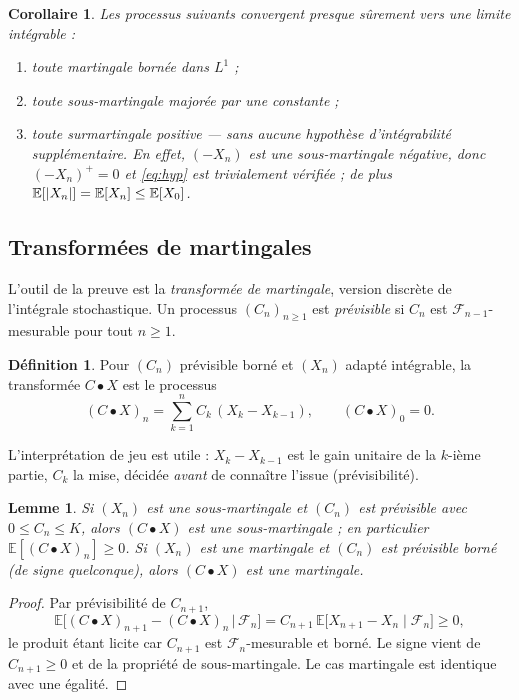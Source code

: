 \documentclass[11pt,a4paper]{article}
\theoremstyle{plain}
\newtheorem{lemma}[theorem]{Lemme}
\newtheorem{corollary}[theorem]{Corollaire}
\theoremstyle{definition}
\newtheorem{definition}[theorem]{Définition}
\theoremstyle{remark}
\newcommand{\E}{\mathbb{E}}
\newcommand{\F}{\mathcal{F}}
\DeclarePairedDelimiter{\abs}{\lvert}{\rvert}
\begin{document}
\begin{corollary}\label{cor:cas-part}
Les processus suivants convergent presque sûrement vers une limite intégrable :
\begin{enumerate}[label=(\roman*)]
\item toute martingale bornée dans $L^1$ ;
\item toute sous-martingale majorée par une constante ;
\item toute surmartingale positive --- sans aucune hypothèse d'intégrabilité
      supplémentaire. En effet, $(-X_n)$ est une sous-martingale négative, donc
      $(-X_n)^+ = 0$ et \eqref{eq:hyp} est trivialement vérifiée ; de plus
      $\E[\abs{X_n}] = \E[X_n] \le \E[X_0]$.
\end{enumerate}
\end{corollary}

\subsection{Transformées de martingales}

L'outil de la preuve est la \emph{transformée de martingale}, version discrète de
l'intégrale stochastique. Un processus $(C_n)_{n\ge1}$ est \emph{prévisible} si
$C_n$ est $\F_{n-1}$-mesurable pour tout $n \ge 1$.

\begin{definition}
Pour $(C_n)$ prévisible borné et $(X_n)$ adapté intégrable, la transformée
$C \bullet X$ est le processus
\[
(C \bullet X)_n = \sum_{k=1}^{n} C_k\,(X_k - X_{k-1}),
\qquad (C \bullet X)_0 = 0.
\]
\end{definition}

L'interprétation de jeu est utile : $X_k - X_{k-1}$ est le gain unitaire de la
$k$-ième partie, $C_k$ la mise, décidée \emph{avant} de connaître l'issue
(prévisibilité).

\begin{lemma}\label{lem:transform}
Si $(X_n)$ est une sous-martingale et $(C_n)$ est prévisible avec
$0 \le C_n \le K$, alors $(C \bullet X)$ est une sous-martingale ; en
particulier $\E[(C\bullet X)_n] \ge 0$. Si $(X_n)$ est une martingale et
$(C_n)$ est prévisible borné (de signe quelconque), alors $(C \bullet X)$ est
une martingale.
\end{lemma}

\begin{proof}
Par prévisibilité de $C_{n+1}$,
\[
\E\bigl[(C\bullet X)_{n+1} - (C\bullet X)_n \,\big|\, \F_n\bigr]
= C_{n+1}\, \E\bigl[X_{n+1} - X_n \mid \F_n\bigr] \ge 0,
\]
le produit étant licite car $C_{n+1}$ est $\F_n$-mesurable et borné. Le signe
vient de $C_{n+1} \ge 0$ et de la propriété de sous-martingale. Le cas
martingale est identique avec une égalité.
\end{proof}
\end{document}
